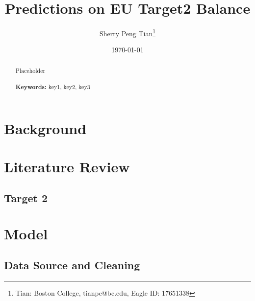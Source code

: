 \documentclass[12pt]{article}
\begin{document}
\begin{titlepage}
\title{Predictions on EU Target2 Balance}
\author{Sherry Peng Tian\thanks{Tian: Boston College, tianpe@bc.edu, Eagle ID: 17651338}}
\date{\today}
\maketitle
\begin{abstract}
\noindent Placeholder\\
\vspace{0in}\\
\noindent\textbf{Keywords:} key1, key2, key3\\
\bigskip
\end{abstract}
\setcounter{page}{0}
\thispagestyle{empty}
\end{titlepage}

\pagebreak \newpage

\doublespacing






\section{Background} \label{sec:background}

\section{Literature Review} \label{sec:literature}
\subsection{Target 2}

\section{Model} \label{sec:model}
\subsection{Data Source and Cleaning}
\end{document}
